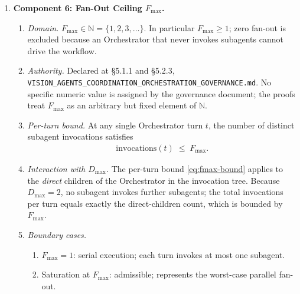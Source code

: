 \documentclass[12pt]{article}
\theoremstyle{definition}
\newcommand{\code}[1]{\texttt{#1}}
\newcommand{\VisionGov}{\code{VISION\_AGENTS\_\allowbreak COORDINATION\_\allowbreak ORCHESTRATION\_\allowbreak GOVERNANCE.md}}
\begin{document}
\begin{enumerate}
  \item \textbf{Component 6: Fan-Out Ceiling $F_{\max}$.}
  \begin{enumerate}
    \item[6.1] \emph{Domain.}
               $F_{\max} \in \mathbb{N} = \{1,2,3,\ldots\}$.
               In particular $F_{\max} \geq 1$; zero fan-out is
               excluded because an Orchestrator that never invokes
               subagents cannot drive the workflow.
    \item[6.2] \emph{Authority.}
               Declared at \S5.1.1 and \S5.2.3,
               \VisionGov{}.
               No specific numeric value is assigned by the governance
               document; the proofs treat $F_{\max}$ as an arbitrary
               but fixed element of $\mathbb{N}$.
    \item[6.3] \emph{Per-turn bound.}
               At any single Orchestrator turn $t$, the number of
               distinct subagent invocations satisfies
               \begin{align}
                 \mathrm{invocations}(t) \;\leq\; F_{\max}.
                 \label{eq:fmax-bound}
               \end{align}
    \item[6.4] \emph{Interaction with $D_{\max}$.}
               The per-turn bound \eqref{eq:fmax-bound} applies to
               the \emph{direct} children of the Orchestrator in the
               invocation tree.  Because $D_{\max} = 2$, no subagent
               invokes further subagents; the total invocations per
               turn equals exactly the direct-children count, which is
               bounded by $F_{\max}$.
    \item[6.5] \emph{Boundary cases.}
               \begin{enumerate}
                 \item[(a)] $F_{\max} = 1$: serial execution; each
                            turn invokes at most one subagent.
                 \item[(b)] Saturation at $F_{\max}$: admissible;
                            represents the worst-case parallel
                            fan-out.
               \end{enumerate}
  \end{enumerate}


\end{enumerate}
\end{document}
